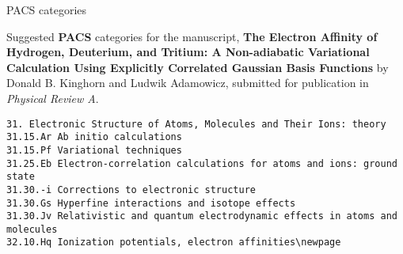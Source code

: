 \documentclass[12pt,thmsa]{article}
\begin{document}
\author{}
\title{}
\date{}
\maketitle

\begin{abstract}
\end{abstract}

\pagebreak 

\begin{center}
{\LARGE PACS categories}
\end{center}

Suggested \textbf{PACS }categories for the manuscript, \textbf{The Electron
Affinity of Hydrogen, Deuterium, and Tritium: A Non-adiabatic Variational
Calculation Using Explicitly Correlated Gaussian Basis Functions} by Donald
B. Kinghorn and Ludwik Adamowicz, submitted for publication in \emph{%
Physical Review A}.
\begin{verbatim}
31. Electronic Structure of Atoms, Molecules and Their Ions: theory
31.15.Ar Ab initio calculations
31.15.Pf Variational techniques
31.25.Eb Electron-correlation calculations for atoms and ions: ground state
31.30.-i Corrections to electronic structure
31.30.Gs Hyperfine interactions and isotope effects
31.30.Jv Relativistic and quantum electrodynamic effects in atoms and molecules
32.10.Hq Ionization potentials, electron affinities\newpage 
\end{verbatim}
\end{document}
